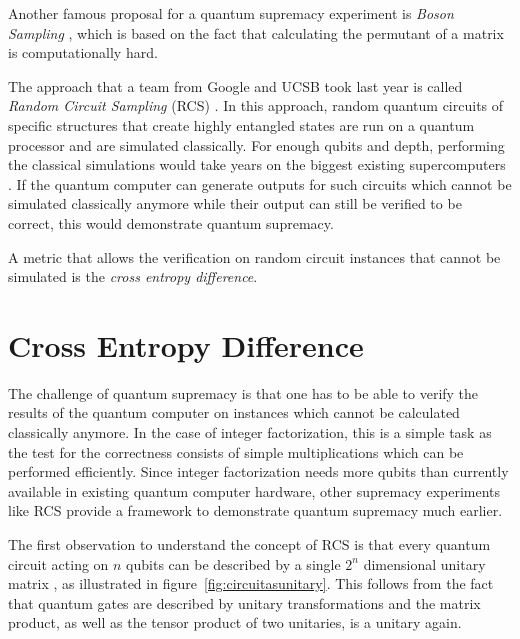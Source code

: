 Another famous proposal for a quantum supremacy experiment is \textit{Boson Sampling} \cite{aaronson2013boson}, which is based on the
fact that calculating the permutant of a matrix is computationally hard.

The approach that a team from Google and UCSB took last year is called \textit{Random
  Circuit Sampling} (RCS) \cite{Boixo2018supremacy, martines2019supremacy}. In this approach, random quantum circuits of specific structures that create highly
entangled states are run on a quantum processor and are simulated classically. For
enough qubits and depth, performing the classical simulations would take years on the biggest existing supercomputers \cite{martines2019supremacy}. If the quantum computer can generate outputs
for such circuits which cannot be simulated classically anymore while their output can still be
verified to be correct, this would demonstrate quantum supremacy. 

A metric that
allows the verification on random circuit instances that cannot be simulated is
the \textit{cross entropy difference}.

\section{Cross Entropy Difference}

The challenge of quantum supremacy is that one has to be able to verify the
results of the quantum computer on instances which cannot be calculated
classically anymore. In the case of integer factorization, this is a simple task
as the test for the correctness consists of simple multiplications which can be
performed efficiently. Since integer factorization needs more qubits than
currently available in existing quantum computer hardware, other supremacy
experiments like RCS provide a framework to demonstrate quantum supremacy much
earlier.

The first observation to understand the concept of RCS is that every quantum
circuit acting on $n$ qubits can be described by a single $2^n$ dimensional
unitary matrix \cite{nielsen2002quantum}, as illustrated in figure~\ref{fig:circuitasunitary}. This follows
from the fact that quantum gates are described by unitary transformations and
the matrix product, as well as the tensor product of two unitaries, is a unitary again.

